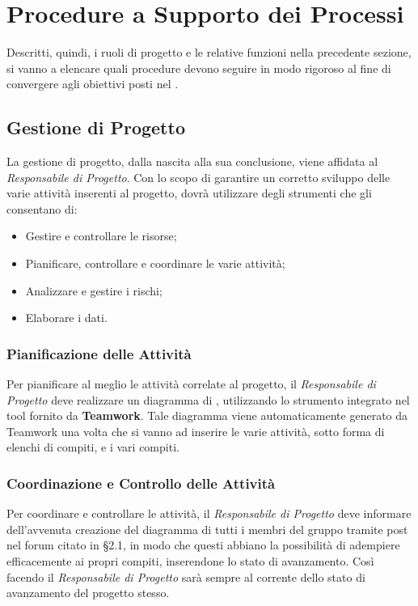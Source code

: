 \section{Procedure a Supporto dei Processi}

Descritti, quindi, i ruoli di progetto e le relative funzioni nella precedente sezione, si vanno a elencare quali procedure devono seguire in modo rigoroso al fine di convergere agli obiettivi posti nel \PianoDiQualifica.

\subsection{Gestione di Progetto}

La gestione di progetto, dalla nascita alla sua conclusione, viene affidata al \textit{Responsabile di Progetto}. Con lo scopo di garantire un corretto sviluppo delle varie attività inserenti al progetto, dovrà utilizzare degli strumenti che gli consentano di:

\begin{itemize}
\item Gestire e controllare le risorse;
\item Pianificare, controllare e coordinare le varie attività;
\item Analizzare e gestire i rischi;
\item Elaborare i dati.
\end{itemize}

\subsubsection{Pianificazione delle Attività}
Per pianificare al meglio le attività correlate al progetto, il \textit{Responsabile di Progetto} deve realizzare un diagramma di , utilizzando lo strumento integrato nel tool fornito da \textbf{Teamwork}. Tale diagramma viene automaticamente generato da Teamwork una volta che si vanno ad inserire le varie attività, sotto forma di elenchi di compiti, e i vari compiti.

\subsubsection{Coordinazione e Controllo delle Attività}
Per coordinare e controllare le attività, il \textit{Responsabile di Progetto} deve informare dell'avvenuta creazione del diagramma di  tutti i membri del gruppo tramite post nel forum citato in §2.1, in modo che questi abbiano la possibilità di adempiere efficacemente ai propri compiti, inserendone lo stato di avanzamento. Così facendo il \textit{Responsabile di Progetto} sarà sempre al corrente dello stato di avanzamento del progetto stesso.


